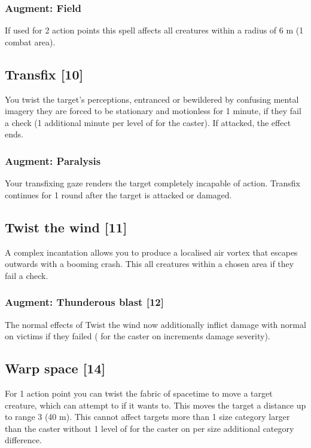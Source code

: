 \subsubsection{Augment: Field}
If used for 2 action points this spell affects all creatures within a radius of 6 m (1 combat area).


\subsection{Transfix [10]}
\label{spell:transfix}
You twist the target's perceptions, entranced or bewildered by confusing mental imagery they are forced to be stationary and motionless for 1 minute, if they fail a  check (1 additional minute per level of  for the caster). If attacked, the effect ends. 
\subsubsection{Augment: Paralysis}
Your transfixing gaze renders the target completely incapable of action. Transfix continues for 1 round after the target is attacked or damaged.


\subsection{Twist the wind [11]}
A complex incantation allows you to produce a localised air vortex that escapes outwards with a booming crash. This  all creatures within a chosen area if they fail a  check.
\subsubsection{Augment: Thunderous blast [12]}
The normal effects of Twist the wind now additionally inflict damage with normal  on victims if they failed  ( for the caster on  increments damage severity).


\subsection{Warp space [14]}
For 1 action point you can twist the fabric of spacetime to move a target creature, which can attempt to  if it wants to. This moves the target a distance up to range 3 (40 m). This cannot affect targets more than 1 size category larger than the caster without 1 level of  for the caster on  per size additional category difference.


